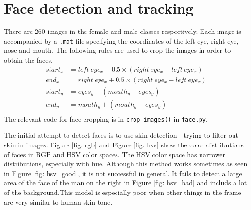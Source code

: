 \documentclass{article}
\begin{document}
\section{Face detection and tracking}
There are 260 images in the female and male classes respectively. Each image is accompanied by a \texttt{.mat} file specifying the coordinates of the left eye, right eye, nose and mouth. The following rules are used to crop the images in order to obtain the faces.
\begin{equation}
\begin{split}
start_x &= left~eye_x - 0.5\times(right~eye_x - left~eye_x) \\
end_x &= right~eye_x + 0.5\times(right~eye_x - left~eye_x) \\
start_y &= eyes_y - (mouth_y - eyes_y) \\
end_y &= mouth_y + (mouth_y - eyes_y) \\
\end{split}
\end{equation}
The relevant code for face cropping is in \texttt{crop\_images()} in \texttt{face.py}.

The initial attempt to detect faces is to use skin detection - trying to filter out skin in images. Figure \ref{fig: rgb} and Figure \ref{fig: hsv} show the color distributions of faces in RGB and HSV color spaces. The HSV color space has narrower distributions, especially with hue. Although this method works sometimes as seen in Figure \ref{fig: hsv_good}, it is not successful in general. It fails to detect a large area of the face of the man on the right in Figure \ref{fig: hsv_bad} and includs a lot of the background.This model is especially poor when other things in the frame are very similar to human skin tone.
\end{document}
